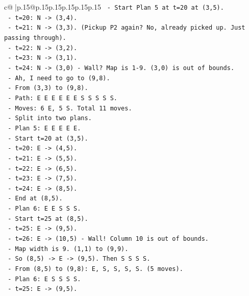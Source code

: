 \documentclass{article}
\begin{document}
{\begin{supertabular}{c@{$\;$}|p{.15\linewidth}@{}p{.15\linewidth}p{.15\linewidth}p{.15\linewidth}p{.15\linewidth}p{.15\linewidth}}
{{{\texttt{         {-} Start Plan 5 at t=20 at (3,5).} \\
\texttt{         {-} t=20: N {-}> (3,4).} \\
\texttt{         {-} t=21: N {-}> (3,3). (Pickup P2 again? No, already picked up. Just passing through).} \\
\texttt{         {-} t=22: N {-}> (3,2).} \\
\texttt{         {-} t=23: N {-}> (3,1).} \\
\texttt{         {-} t=24: N {-}> (3,0) {-} Wall? Map is 1{-}9. (3,0) is out of bounds.} \\
\texttt{         {-} Ah, I need to go to (9,8).} \\
\texttt{         {-} From (3,3) to (9,8).} \\
\texttt{         {-} Path: E E E E E E S S S S S.} \\
\texttt{         {-} Moves: 6 E, 5 S. Total 11 moves.} \\
\texttt{         {-} Split into two plans.} \\
\texttt{         {-} Plan 5: E E E E E.} \\
\texttt{           {-} Start t=20 at (3,5).} \\
\texttt{           {-} t=20: E {-}> (4,5).} \\
\texttt{           {-} t=21: E {-}> (5,5).} \\
\texttt{           {-} t=22: E {-}> (6,5).} \\
\texttt{           {-} t=23: E {-}> (7,5).} \\
\texttt{           {-} t=24: E {-}> (8,5).} \\
\texttt{           {-} End at (8,5).} \\
\texttt{         {-} Plan 6: E E S S S.} \\
\texttt{           {-} Start t=25 at (8,5).} \\
\texttt{           {-} t=25: E {-}> (9,5).} \\
\texttt{           {-} t=26: E {-}> (10,5) {-} Wall! Column 10 is out of bounds.} \\
\texttt{           {-} Map width is 9. (1,1) to (9,9).} \\
\texttt{           {-} So (8,5) {-}> E {-}> (9,5). Then S S S S.} \\
\texttt{           {-} From (8,5) to (9,8): E, S, S, S, S. (5 moves).} \\
\texttt{           {-} Plan 6: E S S S S.} \\
\texttt{             {-} t=25: E {-}> (9,5).} \\
}}}
\end{supertabular}}
\end{document}
